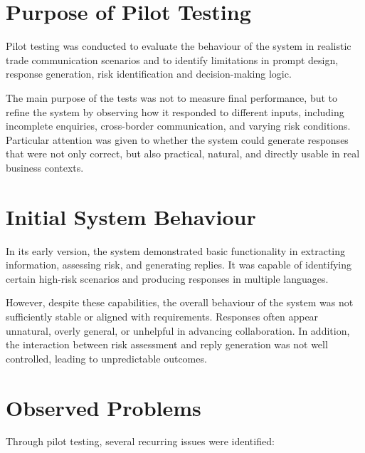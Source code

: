 \documentclass[12pt,a4paper]{report}
\begin{document}
\section{Purpose of Pilot Testing}

Pilot testing was conducted to evaluate the behaviour of the system in realistic trade communication scenarios and to identify limitations in prompt design, response generation, risk identification and decision-making logic. 

The main purpose of the tests was not to measure final performance, but to refine the system by observing how it responded to different inputs, including incomplete enquiries, cross-border communication, and varying risk conditions. Particular attention was given to whether the system could generate responses that were not only correct, but also practical, natural, and directly usable in real business contexts.

\section{Initial System Behaviour}

In its early version, the system demonstrated basic functionality in extracting information, assessing risk, and generating replies. It was capable of identifying certain high-risk scenarios and producing responses in multiple languages.

However, despite these capabilities, the overall behaviour of the system was not sufficiently stable or aligned with requirements. Responses often appear unnatural, overly general, or unhelpful in advancing collaboration. In addition, the interaction between risk assessment and reply generation was not well controlled, leading to unpredictable outcomes.

\section{Observed Problems}

Through pilot testing, several recurring issues were identified:
\end{document}
